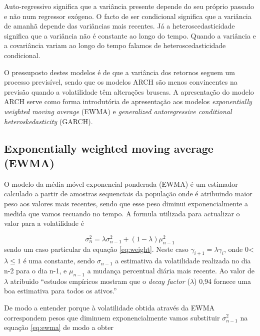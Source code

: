 \documentclass[
  12pt,
  a4paper,
  openany]{book}
\begin{document}
Auto-regressivo significa que a variância presente depende do seu próprio passado e não num regressor exógeno. O facto de ser condicional significa que a variância de amanhã depende das variâncias mais recentes. Já a heteroscedasticidade significa que a variância não é constante ao longo do tempo. Quando a variância e a covariância variam ao longo do tempo falamos de heteroscedasticidade condicional.

O pressuposto destes modelos é de que a variância dos retornos seguem um processo previsível, sendo que os modelos ARCH são menos convincentes na previsão quando a volatilidade têm alterações bruscas. A apresentação do modelo ARCH serve como forma introdutória de apresentação aos modelos \emph{exponentially weighted moving average} (EWMA) e \emph{generalized autoregressive conditional heteroskedasticity} (GARCH).

\hypertarget{exponentially-weighted-moving-average-ewma}{%
\subsection{Exponentially weighted moving average (EWMA)}\label{exponentially-weighted-moving-average-ewma}}

O modelo da média móvel exponencial ponderada (EWMA) é um estimador calculado a partir de amostras sequenciais da população onde é atribuindo maior peso aos valores mais recentes, sendo que esse peso diminui exponencialmente a medida que vamos recuando no tempo. A formula utilizada para actualizar o valor para a volatilidade é

\begin{equation} 
  \sigma_{n}^{2} = \lambda\sigma_{n-1}^{2}+(1-\lambda)\mu_{n-1}^{2} 
  \label{eq:ewma}
\end{equation}
sendo um caso particular da equação \eqref{eq:weight}. Neste caso \(\gamma_{i+1} = \lambda\gamma_{i}\), onde 0\textless{}\(\lambda\leq1\) é uma constante, sendo \(\sigma_{n-1}\) a estimativa da volatilidade realizada no dia n-2 para o dia n-1, e \(\mu_{n-1}\) a mudança percentual diária mais recente. Ao valor de \(\lambda\) atribuido ``estudos empíricos mostram que o \emph{decay factor} (\(\lambda\)) 0,94 fornece uma boa estimativa para todos os ativos.''\citep[p.4]{riskmetrics}

De modo a entender porque à volatilidade obtida através da EWMA correspondem pesos que diminuem exponencialmente vamos substituir \(\sigma_{n-1}^{2}\) na equação \eqref{eq:ewma} de modo a obter
\end{document}
